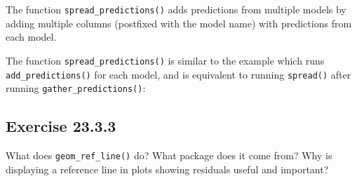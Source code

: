 \documentclass[]{book}
\newenvironment{Shaded}{\begin{snugshade}}{\end{snugshade}}
\newcommand{\CommentTok}[1]{\textcolor[rgb]{0.56,0.35,0.01}{\textit{#1}}}
\newcommand{\KeywordTok}[1]{\textcolor[rgb]{0.13,0.29,0.53}{\textbf{#1}}}
\newcommand{\NormalTok}[1]{#1}
\newcommand{\OperatorTok}[1]{\textcolor[rgb]{0.81,0.36,0.00}{\textbf{#1}}}
\newcommand{\StringTok}[1]{\textcolor[rgb]{0.31,0.60,0.02}{#1}}
\theoremstyle{plain}
\theoremstyle{remark}
\theoremstyle{definition}
\theoremstyle{definition}
\theoremstyle{definition}
\theoremstyle{remark}
\begin{document}
The function \texttt{spread\_predictions()} adds predictions from
multiple models by adding multiple columns (postfixed with the model
name) with predictions from each model.

\begin{Shaded}
\end{Shaded}

The function \texttt{spread\_predictions()} is similar to the example
which runs \texttt{add\_predictions()} for each model, and is equivalent
to running \texttt{spread()} after running
\texttt{gather\_predictions()}:

\begin{Shaded}
\end{Shaded}

\hypertarget{exercise-23.3.3}{%
\subsection*{\texorpdfstring{Exercise
{23.3.3}}{Exercise 23.3.3}}\label{exercise-23.3.3}}

What does \texttt{geom\_ref\_line()} do? What package does it come from?
Why is displaying a reference line in plots showing residuals useful and
important?
\end{document}
